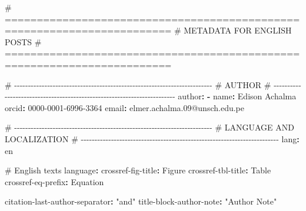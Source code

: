 \documentclass[
  doc,
  floatsintext,
  longtable,
  a4paper,
  nolmodern,
  notxfonts,
  notimes,
  12pt,
  colorlinks=true,linkcolor=blue,citecolor=blue,urlcolor=blue]{apa7}
\newenvironment{Shaded}{\begin{snugshade}}{\end{snugshade}}
\newcommand{\AttributeTok}[1]{\textcolor[rgb]{0.40,0.45,0.13}{#1}}
\newcommand{\CommentTok}[1]{\textcolor[rgb]{0.37,0.37,0.37}{#1}}
\newcommand{\FunctionTok}[1]{\textcolor[rgb]{0.28,0.35,0.67}{#1}}
\newcommand{\KeywordTok}[1]{\textcolor[rgb]{0.00,0.23,0.31}{\textbf{#1}}}
\newcommand{\StringTok}[1]{\textcolor[rgb]{0.13,0.47,0.30}{#1}}
\begin{document}
\begin{Shaded}
\begin{Highlighting}[]
\CommentTok{\# ========================================================================}
\CommentTok{\# METADATA FOR ENGLISH POSTS}
\CommentTok{\# ========================================================================}

\CommentTok{\# {-}{-}{-}{-}{-}{-}{-}{-}{-}{-}{-}{-}{-}{-}{-}{-}{-}{-}{-}{-}{-}{-}{-}{-}{-}{-}{-}{-}{-}{-}{-}{-}{-}{-}{-}{-}{-}{-}{-}{-}{-}{-}{-}{-}{-}{-}{-}{-}{-}{-}{-}{-}{-}{-}{-}{-}{-}{-}{-}{-}{-}{-}{-}{-}{-}{-}{-}{-}{-}{-}{-}{-}}
\CommentTok{\# AUTHOR}
\CommentTok{\# {-}{-}{-}{-}{-}{-}{-}{-}{-}{-}{-}{-}{-}{-}{-}{-}{-}{-}{-}{-}{-}{-}{-}{-}{-}{-}{-}{-}{-}{-}{-}{-}{-}{-}{-}{-}{-}{-}{-}{-}{-}{-}{-}{-}{-}{-}{-}{-}{-}{-}{-}{-}{-}{-}{-}{-}{-}{-}{-}{-}{-}{-}{-}{-}{-}{-}{-}{-}{-}{-}{-}{-}}
\FunctionTok{author}\KeywordTok{:}
\AttributeTok{  }\KeywordTok{{-}}\AttributeTok{ }\FunctionTok{name}\KeywordTok{:}\AttributeTok{ Edison Achalma}
\AttributeTok{    }\FunctionTok{orcid}\KeywordTok{:}\AttributeTok{ 0000{-}0001{-}6996{-}3364}
\AttributeTok{    }\FunctionTok{email}\KeywordTok{:}\AttributeTok{ elmer.achalma.09@unsch.edu.pe}

\CommentTok{\# {-}{-}{-}{-}{-}{-}{-}{-}{-}{-}{-}{-}{-}{-}{-}{-}{-}{-}{-}{-}{-}{-}{-}{-}{-}{-}{-}{-}{-}{-}{-}{-}{-}{-}{-}{-}{-}{-}{-}{-}{-}{-}{-}{-}{-}{-}{-}{-}{-}{-}{-}{-}{-}{-}{-}{-}{-}{-}{-}{-}{-}{-}{-}{-}{-}{-}{-}{-}{-}{-}{-}{-}}
\CommentTok{\# LANGUAGE AND LOCALIZATION}
\CommentTok{\# {-}{-}{-}{-}{-}{-}{-}{-}{-}{-}{-}{-}{-}{-}{-}{-}{-}{-}{-}{-}{-}{-}{-}{-}{-}{-}{-}{-}{-}{-}{-}{-}{-}{-}{-}{-}{-}{-}{-}{-}{-}{-}{-}{-}{-}{-}{-}{-}{-}{-}{-}{-}{-}{-}{-}{-}{-}{-}{-}{-}{-}{-}{-}{-}{-}{-}{-}{-}{-}{-}{-}{-}}
\FunctionTok{lang}\KeywordTok{:}\AttributeTok{ en}

\CommentTok{\# English texts}
\FunctionTok{language}\KeywordTok{:}
\AttributeTok{  }\FunctionTok{crossref{-}fig{-}title}\KeywordTok{:}\AttributeTok{ Figure}
\AttributeTok{  }\FunctionTok{crossref{-}tbl{-}title}\KeywordTok{:}\AttributeTok{ Table}
\AttributeTok{  }\FunctionTok{crossref{-}eq{-}prefix}\KeywordTok{:}\AttributeTok{ Equation}

\FunctionTok{citation{-}last{-}author{-}separator}\KeywordTok{:}\AttributeTok{ }\StringTok{"and"}
\FunctionTok{title{-}block{-}author{-}note}\KeywordTok{:}\AttributeTok{ }\StringTok{"Author Note"}


\end{Highlighting}
\end{Shaded}
\end{document}
